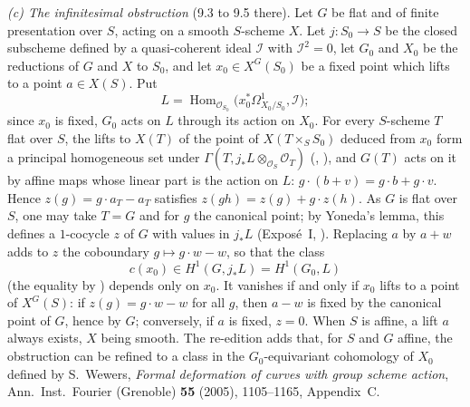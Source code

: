 \emph{(c) The infinitesimal obstruction} (9.3 to 9.5 there). Let \(G\) be
flat and of finite presentation over \(S\), acting on a smooth \(S\)-scheme
\(X\). Let \(j\colon S_0\to S\) be the closed subscheme defined by a
quasi-coherent ideal \(\mathcal I\) with \(\mathcal I^2=0\), let \(G_0\) and
\(X_0\) be the reductions of \(G\) and \(X\) to \(S_0\), and let
\(x_0\in X^G(S_0)\) be a fixed point which lifts to a point \(a\in X(S)\).
Put
\[
  L=\operatorname{Hom}_{\mathcal O_{S_0}}
    \bigl(x_0^*\Omega^1_{X_0/S_0},\mathcal I\bigr);
\]
since \(x_0\) is fixed, \(G_0\) acts on \(L\) through its action on \(X_0\).
For every \(S\)-scheme \(T\) flat over \(S\), the lifts to \(X(T)\) of the
point of \(X(T\times_SS_0)\) deduced from \(x_0\) form a principal
homogeneous set under \(\Gamma(T,j_*L\otimes_{\mathcal O_S}\mathcal O_T)\)
(, ),
and \(G(T)\) acts on it by affine maps whose linear part is the action on
\(L\): \(g\cdot(b+v)=g\cdot b+g\cdot v\). Hence \(z(g)=g\cdot a_T-a_T\)
satisfies \(z(gh)=z(g)+g\cdot z(h)\). As \(G\) is flat over \(S\), one may
take \(T=G\) and for \(g\) the canonical point; by Yoneda's lemma, this
defines a \(1\)-cocycle \(z\) of \(G\) with values in \(j_*L\)
(Exposé~I, ). Replacing \(a\) by \(a+w\) adds to \(z\)
the coboundary \(g\mapsto g\cdot w-w\), so that the class
\[
  c(x_0)\in H^1(G,j_*L)=H^1(G_0,L)
\]
(the equality by ) depends only on \(x_0\).
It vanishes if and only if \(x_0\) lifts to a point of \(X^G(S)\): if
\(z(g)=g\cdot w-w\) for all \(g\), then \(a-w\) is fixed by the canonical
point of \(G\), hence by \(G\); conversely, if \(a\) is fixed, \(z=0\).
When \(S\) is affine, a lift \(a\) always exists, \(X\) being smooth. The
re-edition adds that, for \(S\) and \(G\) affine, the obstruction can be
refined to a class in the \(G_0\)-equivariant cohomology of \(X_0\) defined
by S.~Wewers, \emph{Formal deformation of curves with group scheme action},
Ann.\ Inst.\ Fourier (Grenoble) \textbf{55} (2005), 1105--1165,
Appendix~C.

